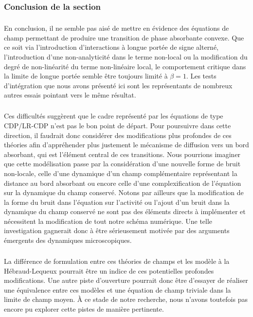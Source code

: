 \subsubsection{Conclusion de la section}

\subparagraph{}En conclusion, il ne semble pas aisé de mettre en évidence des équations de champ permettant de produire une transition de phase absorbante convexe. Que ce soit via l'introduction d'interactions à longue portée de signe alterné, l'introduction d'une non-analyticité dans le terme non-local ou la modification du degré de non-linéarité du terme non-linéaire local, le comportement critique dans la limite de longue portée semble être toujours limité à $\beta = 1$. Les tests d'intégration que nous avons présenté ici sont les représentants de nombreux autres essais pointant vers le même résultat. 

\subparagraph{}Ces difficultés suggèrent que le cadre représenté par les équations de type CDP/LR-CDP n'est pas le bon point de départ. Pour poursuivre dans cette direction, il faudrait donc considérer des modifications plus profondes de ces théories afin d'appréhender plus justement le mécanisme de diffusion vers un bord absorbant, qui est l'élément central de ces transitions. Nous pourrions imaginer que cette modélisation passe par la considération d'une nouvelle forme de bruit non-locale, celle d'une dynamique d'un champ complémentaire représentant la distance au bord absorbant ou encore celle d'une complexification de l'équation sur la dynamique du champ conservé. Notons par ailleurs que la modification de la forme du bruit dans l'équation sur l'activité ou l'ajout d'un bruit dans la dynamique du champ conservé ne sont pas des éléments directs à implémenter et nécessitent la modification de tout notre schéma numérique. Une telle investigation gagnerait donc à être sérieusement motivée par des arguments émergents des dynamiques microscopiques.

\subparagraph{}La différence de formulation entre ces théories de champs et les modèle à la Hébraud-Lequeux pourrait être un indice de ces potentielles profondes modifications. Une autre piste d'ouverture pourrait donc être d'essayer de réaliser une équivalence entre ces modèles et une équation de champ triviale dans la limite de champ moyen. \`A ce stade de notre recherche, nous n'avons toutefois pas encore pu explorer cette pistes de manière pertinente.

